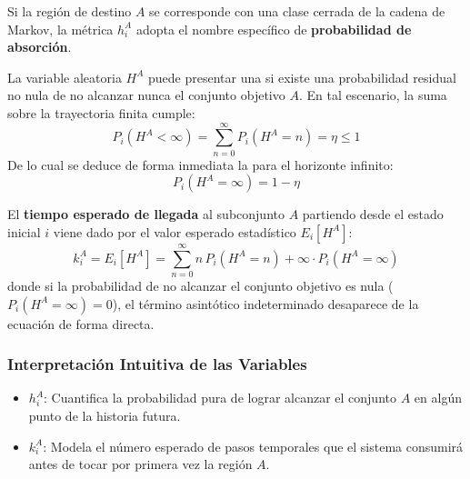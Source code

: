 \begin{observacion}
    Si la región de destino $A$ se corresponde con una clase cerrada de la cadena de Markov, la métrica $h_i^A$ adopta el nombre específico de \textbf{probabilidad de absorción}.
\end{observacion}

\begin{definicion}
    La variable aleatoria $H^A$ puede presentar una  si existe una probabilidad residual no nula de no alcanzar nunca el conjunto objetivo $A$. En tal escenario, la suma sobre la trayectoria finita cumple:
    \[
    P_i(H^A < \infty) = \sum_{n=0}^{\infty} P_i(H^A = n) = \eta \leq 1
    \]
    De lo cual se deduce de forma inmediata la  para el horizonte infinito:
    \[
    P_i(H^A = \infty) = 1 - \eta
    \]
\end{definicion}

\begin{definicion}
    El \textbf{tiempo esperado de llegada} al subconjunto $A$ partiendo desde el estado inicial $i$ viene dado por el valor esperado estadístico $E_i[H^A]$:
    \[ 
    k_i^A = E_i[H^A] = \sum_{n=0}^{\infty} n \, P_i(H^A = n) + \infty \cdot P_i(H^A = \infty) 
    \]
    donde si la probabilidad de no alcanzar el conjunto objetivo es nula ($P_i(H^A = \infty) = 0$), el término asintótico indeterminado desaparece de la ecuación de forma directa.
\end{definicion}

\subsubsection*{Interpretación Intuitiva de las Variables}
\begin{itemize}
    \item $h_i^A$: Cuantifica la probabilidad pura de lograr alcanzar el conjunto $A$ en algún punto de la historia futura.
    \item $k_i^A$: Modela el número esperado de pasos temporales que el sistema consumirá antes de tocar por primera vez la región $A$.
\end{itemize}

